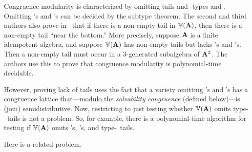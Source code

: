 Congruence modularity is characterized by omitting tails and 
\tct-types \utyp and \styp.
Omitting \utyp's and \styp's can be decided by the subtype theorem.
The second and third authors also prove in~\cite{Freese:2009} that
if there is a 
non-empty 
tail in $\operatorname{\mathbb{V}}(\mathbf{A})$, then there is a 
non-empty
tail ``near the bottom.''
More precisely, suppose $\mathbf{A}$ is a finite idempotent algebra, and suppose
$\operatorname{\mathbb{V}}(\mathbf{A})$ has non-empty tails but lacks \utyp's and \styp's.
Then a non-empty tail must occur in a 3-generated subalgebra of $\mathbf{A}^2$.
The authors use this to prove that congruence modularity is polynomial-time decidable.

However, proving lack of tails uses the fact that a variety omitting
\utyp's and \styp's has a congruence lattice that---modulo 
the {\it solvability congruence} (defined below)---is (join) semidistributive.
Now, restricting to just testing whether $\operatorname{\mathbb{V}}(\mathbf{A})$ omits 
type-\atyp\ tails is not a problem. So, for example, there is a 
polynomial-time algorithm for testing if
$\operatorname{\mathbb{V}}(\mathbf{A})$ omits \utyp's, \styp's, and type-\atyp\ tails.  

Here is a related problem.

\begin{comment}
\begin{prob}
  \label{prob:3}
  Is there an $\alg{A}$, idempotent and having a Taylor term, 
  no type-\atyp tail in 
  subalgebras of $\alg{A}^k$, for $k < n$, but having a type-\atyp 
  tail in a subalgebra of $\alg{A}^n$. 
\end{prob}
Perhaps we could construct such an algebra using congruence lattice
representation techniques. 
\end{comment}


